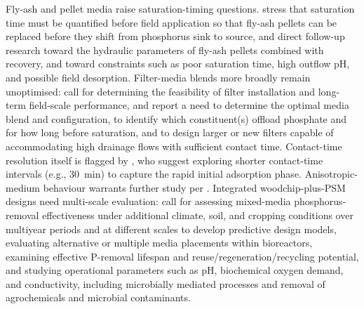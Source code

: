 Fly-ash and pellet media raise saturation-timing questions. \textcite{Li2017} stress that saturation time must be quantified before field application so that fly-ash pellets can be replaced before they shift from phosphorus sink to source, and \textcite{Li2018b} direct follow-up research toward the hydraulic parameters of fly-ash pellets combined with recovery, and toward constraints such as poor saturation time, high outflow pH, and possible field desorption. Filter-media blends more broadly remain unoptimised: \textcite{Agrawal2011} call for determining the feasibility of filter installation and long-term field-scale performance, and \textcite{Agrawal2011b} report a need to determine the optimal media blend and configuration, to identify which constituent(s) offload phosphate and for how long before saturation, and to design larger or new filters capable of accommodating high drainage flows with sufficient contact time. Contact-time resolution itself is flagged by \textcite{Kumari2025}, who suggest exploring shorter contact-time intervals (e.g., 30~min) to capture the rapid initial adsorption phase. Anisotropic-medium behaviour warrants further study per \textcite{Kankarej2023}. Integrated woodchip-plus-PSM designs need multi-scale evaluation: \textcite{Husk2018} call for assessing mixed-media phosphorus-removal effectiveness under additional climate, soil, and cropping conditions over multiyear periods and at different scales to develop predictive design models, evaluating alternative or multiple media placements within bioreactors, examining effective P-removal lifespan and reuse/regeneration/recycling potential, and studying operational parameters such as pH, biochemical oxygen demand, and conductivity, including microbially mediated processes and removal of agrochemicals and microbial contaminants.

